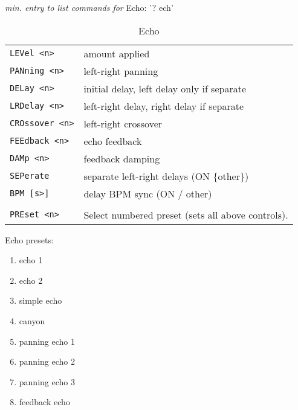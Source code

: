 \vspace{6em}
    \textsl{min. entry to list commands for} Echo:  '? ech'
   \begin{table}[H]
      \centering
      \caption{Echo}
      \begin{tabular}{l l}
\texttt{LEVel <n>} &
   amount applied \\
\texttt{PANning <n>} &
   left-right panning \\
\texttt{DELay <n>} &
   initial delay, left delay only if separate \\
\texttt{LRDelay <n>} &
   left-right delay, right delay if separate \\
\texttt{CROssover <n>} &
   left-right crossover \\
\texttt{FEEdback <n>} &
   echo feedback \\
\texttt{DAMp <n>} &
   feedback damping \\
\texttt{SEPerate} &
   separate left-right delays (ON \{other\}) \\
\texttt{BPM [s>]} &
   delay BPM sync (ON / other) \\
\texttt{} & \\ %
\texttt{PREset <n>} &
   Select numbered preset (sets all above controls). \\
      \end{tabular}
   \end{table}
Echo presets:
   \begin{enumerate}
      \item echo 1
      \item echo 2
      \item simple echo
      \item canyon
      \item panning echo 1
      \item panning echo 2
      \item panning echo 3
      \item feedback echo
    \end{enumerate}

